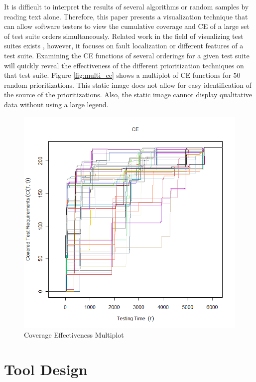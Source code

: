 \documentclass{vgtc}                          %
\begin{document}
It is difficult to interpret the results of several algorithms or random samples by reading text alone.  Therefore, this paper presents a visualization technique that can allow software testers to view the cumulative coverage and CE of a large set of test suite orders simultaneously.   Related work in the field of visualizing test suites exists \cite{tarantula}, however, it focuses on fault localization or different features of a test suite.  Examining the CE functions of several orderings for a given test suite will quickly reveal the effectiveness of the different prioritization techniques on that test suite.  Figure \ref{fig:multi_ce} shows a multiplot of CE functions for 50 random prioritizations.  This static image does not allow for easy identification of the source of the prioritizations.  Also, the static image cannot display qualitative data without using a large legend.  

\begin{figure}[t]
\centering
\includegraphics[scale=.25]{original.png}
\vspace{-.2in}
\caption{Coverage Effectiveness Multiplot}
\vspace{-.2in}
\end{figure}
\label{fig:multi_ce}

\section{Tool Design}
\end{document}
